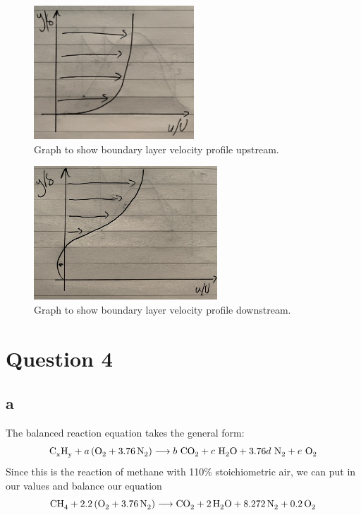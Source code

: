 \documentclass[11pt]{article}
\numberwithin{equation}{section}
\begin{document}
\begin{figure}[H]
    \centering
    \includegraphics[height = 5cm]{./img/q3b1.jpg}
    \caption{Graph to show boundary layer velocity profile upstream.}
    \label{fig:q3b1}
\end{figure}
\begin{figure}[H]
    \centering
    \includegraphics[height = 5cm]{./img/q3b2.jpg}
    \caption{Graph to show boundary layer velocity profile downstream.}
    \label{fig:q3b2}
\end{figure}
\section{Question 4}
\subsection{a}
The balanced reaction equation takes the general form:
\begin{align}
    \ce{C_x H_y} + a \left(\ce{O2} + \ce{3.76N2}\right)&\longrightarrow b \ \ce{CO2} + c \ \ce{H2O} + 3.76 d \ \ce{N2} + e \ \ce{O2}\\
\end{align}
Since this is the reaction of methane with 110\% stoichiometric air, we can put in our values and balance our equation
\begin{equation}
    \ce{CH4} + 2.2\left(\ce{O2} + \ce{3.76N2}\right)\longrightarrow \ce{CO2} + \ce{2H2O} + \ce{8.272N2} + \ce{0.2O2}
\end{equation}
\end{document}
